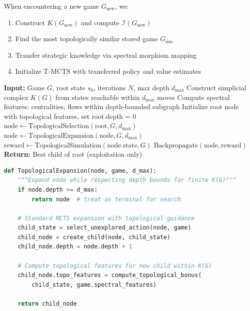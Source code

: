 \documentclass{article}
\begin{document}
When encountering a new game $G_{\text{new}}$, we:

\begin{enumerate}
\item Construct $K(G_{\text{new}})$ and compute $\mathcal{I}(G_{\text{new}})$
\item Find the most topologically similar stored game $G_{\text{sim}}$
\item Transfer strategic knowledge via spectral morphism mapping
\item Initialize T-MCTS with transferred policy and value estimates
\end{enumerate}

\begin{algorithm}
\caption{Topological Monte Carlo Tree Search (with depth bounds)}
\begin{algorithmic}[1]
\STATE \textbf{Input:} Game $G$, root state $s_0$, iterations $N$, max depth $d_{\max}$
\STATE Construct simplicial complex $K(G)$ from states reachable within $d_{\max}$ moves
\STATE Compute spectral features: centralities, flows within depth-bounded subgraph
\STATE Initialize root node with topological features, set root.depth = 0
    \STATE $\text{node} \leftarrow \text{TopologicalSelection}(\text{root}, G, d_{\max})$
        \STATE $\text{node} \leftarrow \text{TopologicalExpansion}(\text{node}, G, d_{\max})$
    \ENDIF
    \STATE $\text{reward} \leftarrow \text{TopologicalSimulation}(\text{node.state}, G)$
    \STATE $\text{Backpropagate}(\text{node}, \text{reward})$
\ENDFOR
\STATE \textbf{Return:} Best child of root (exploitation only)
\end{algorithmic}
\end{algorithm}

\begin{lstlisting}[language=Python, caption=Depth-Bounded Topological Expansion]
def TopologicalExpansion(node, game, d_max):
    """Expand node while respecting depth bounds for finite K(G)"""
    if node.depth >= d_max:
        return node  # treat as terminal for search
    
    # Standard MCTS expansion with topological guidance
    child_state = select_unexplored_action(node, game)
    child_node = create_child(node, child_state)
    child_node.depth = node.depth + 1
    
    # Compute topological features for new child within K(G)
    child_node.topo_features = compute_topological_bonus(
        child_state, game.spectral_features)
    
    return child_node
\end{lstlisting}
\end{document}
